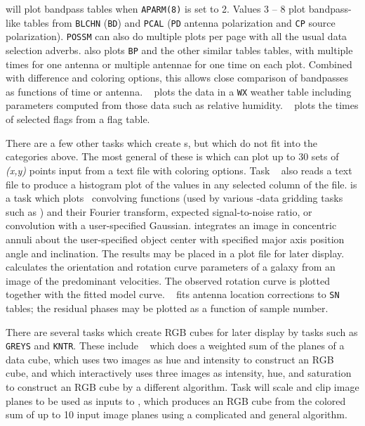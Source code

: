{\tt {}} will plot bandpass tables when {\tt APARM(8)} is
set to 2.  Values 3 -- 8 plot bandpass-like tables from {\tt BLCHN}
({\tt BD}) and {\tt PCAL} ({\tt PD} antenna polarization and {\tt CP}
source polarization).  {\tt POSSM} can also do multiple plots per page
with all the usual data selection adverbs.  {\tt {}} also
plots {\tt BP} and the other similar tables tables, with multiple
times for one antenna or multiple antennae for one time on each plot.
Combined with difference and coloring options, this allows close
comparison of bandpasses as functions of time or antenna.  {\tt
{}} plots the data in a {\tt WX} weather table including
parameters computed from those data such as relative humidity.  {\tt
{}} plots the times of selected flags from a flag table.


     There are a few other tasks which create s, but
which do not fit into the categories above.  The most general of these
is {\tt {}} which can plot up to 30 sets of {\it (x,y)\/}
points input from a text file with coloring options.  Task {\tt
{}} also reads a text file to produce a histogram plot of
the values in any selected column of the file.  {\tt {}} is
a task which plots \AIPS\ convolving functions (used by various
\uv-data gridding tasks such as {\tt {}}) and their Fourier
transform, expected signal-to-noise ratio, or convolution with a
user-specified Gaussian.  {\tt {}} integrates an image in
concentric annuli about the user-specified object center with
specified major axis position angle and inclination.  The results may
be placed in a plot file for later display.  {\tt {}}
calculates the orientation and rotation curve parameters of a galaxy
from an image of the predominant velocities.  The observed rotation
curve is plotted together with the fitted model curve.  {\tt
{}} fits antenna location corrections to {\tt SN} tables;
the residual phases may be plotted as a function of sample number.

There are several tasks which create RGB cubes for later display by
tasks such as {\tt GREYS} and {\tt KNTR}\@.  These include {\tt
{}} which does a weighted sum of the planes of a data cube,
{\tt {}} which uses two images as hue and intensity to
construct an RGB cube, and {\tt {}} which interactively uses
three images as intensity, hue, and saturation to construct an RGB
cube by a different algorithm.  Task {\tt {}} will scale and
clip image planes to be used as inputs to {\tt {}}, which
produces an RGB cube from the colored sum of up to 10 input image
planes using a complicated and general algorithm.

